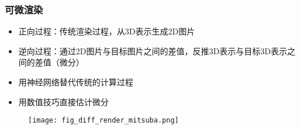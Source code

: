 \begin{frame}
    \frametitle{可微渲染}
    \begin{itemize}
        \item 正向过程：传统渲染过程，从3D表示生成2D图片
        \item 逆向过程：通过2D图片与目标图片之间的差值，反推3D表示与目标3D表示之间的差值（微分）
        \item 用神经网络替代传统的计算过程
        \item 用数值技巧直接估计微分
    \end{itemize}
    \begin{figure}[H]
        \centering
        \texttt{[image: fig\_diff\_render\_mitsuba.png]}
    \end{figure}
\end{frame}
